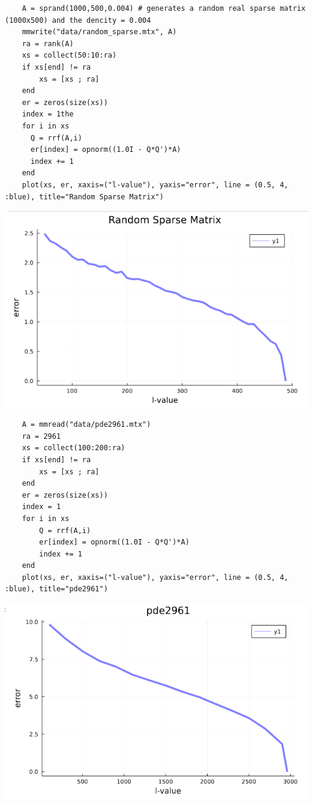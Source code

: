 \documentclass[11pt,a4paper]{article}
\theoremstyle{definition}
\begin{document}
	\begin{lstlisting}
	A = sprand(1000,500,0.004) # generates a random real sparse matrix (1000x500) and the dencity = 0.004
	mmwrite("data/random_sparse.mtx", A)
	ra = rank(A)
	xs = collect(50:10:ra)
	if xs[end] != ra
  		xs = [xs ; ra]
	end
	er = zeros(size(xs))
	index = 1the
	for i in xs 
	  Q = rrf(A,i)
	  er[index] = opnorm((1.0I - Q*Q')*A)
	  index += 1
	end
	plot(xs, er, xaxis=("l-value"), yaxis="error", line = (0.5, 4, :blue), title="Random Sparse Matrix")
	\end{lstlisting}
	\includegraphics[scale=0.5]{images/4.1_1.png}
	
	\begin{lstlisting}
	A = mmread("data/pde2961.mtx")
	ra = 2961
	xs = collect(100:200:ra)
	if xs[end] != ra
	    xs = [xs ; ra]
	end
	er = zeros(size(xs))
	index = 1
	for i in xs 
	    Q = rrf(A,i)
	    er[index] = opnorm((1.0I - Q*Q')*A)
	    index += 1
	end
	plot(xs, er, xaxis=("l-value"), yaxis="error", line = (0.5, 4, :blue), title="pde2961")
	\end{lstlisting}
	\includegraphics[scale=0.5]{images/4.1_2.png}
\end{document}
